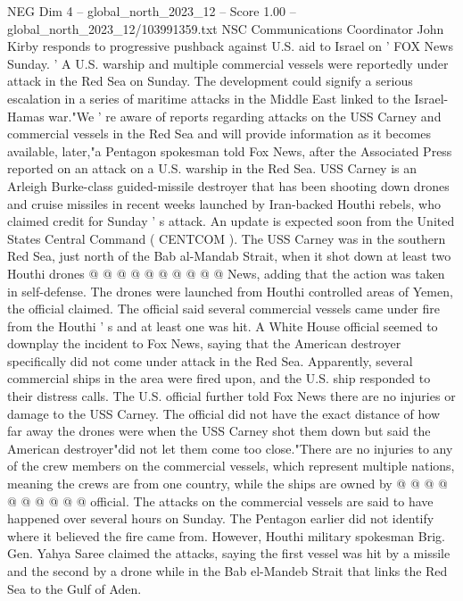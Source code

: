 \begin{textsample}{NEG Dim 4 – global\_north\_2023\_12 – Score 1.00 – global\_north\_2023\_12/103991359.txt}  \label{ex:f4_neg_147}
NSC Communications Coordinator John Kirby responds to progressive pushback against U.S. aid to Israel on ' FOX News Sunday. ' A U.S. warship and multiple commercial vessels were reportedly under attack in the Red Sea on Sunday.
The development could signify a serious escalation in a series of maritime attacks in the Middle East linked to the Israel-Hamas war."We ' re aware of reports regarding attacks on the USS Carney and commercial vessels in the Red Sea and will provide information as it becomes available, later,"a Pentagon spokesman told Fox News, after the Associated Press reported on an attack on a U.S. warship in the Red Sea.
USS Carney is an Arleigh Burke-class guided-missile destroyer that has been shooting down drones and cruise missiles in recent weeks launched by Iran-backed Houthi rebels, who claimed credit for Sunday ' s attack.
An update is expected soon from the United States Central Command ( CENTCOM ).
The USS Carney was in the southern Red Sea, just north of the Bab al-Mandab Strait, when it shot down at least two Houthi drones @ @ @ @ @ @ @ @ @ @ News, adding that the action was taken in self-defense.
The drones were launched from Houthi controlled areas of Yemen, the official claimed.
The official said several commercial vessels came under fire from the Houthi ' s and at least one was hit.
A White House official seemed to downplay the incident to Fox News, saying that the American destroyer specifically did not come under attack in the Red Sea.
Apparently, several commercial ships in the area were fired upon, and the U.S. ship responded to their distress calls.
The U.S. official further told Fox News there are no injuries or damage to the USS Carney.
The official did not have the exact distance of how far away the drones were when the USS Carney shot them down but said the American destroyer"did not let them come too close."There are no injuries to any of the crew members on the commercial vessels, which represent multiple nations, meaning the crews are from one country, while the ships are owned by @ @ @ @ @ @ @ @ @ @ official.
The attacks on the commercial vessels are said to have happened over several hours on Sunday.
The Pentagon earlier did not identify where it believed the fire came from.
However, Houthi military spokesman Brig.
Gen.
Yahya Saree claimed the attacks, saying the first vessel was hit by a missile and the second by a drone while in the Bab el-Mandeb Strait that links the Red Sea to the Gulf of Aden.

\end{textsample}
